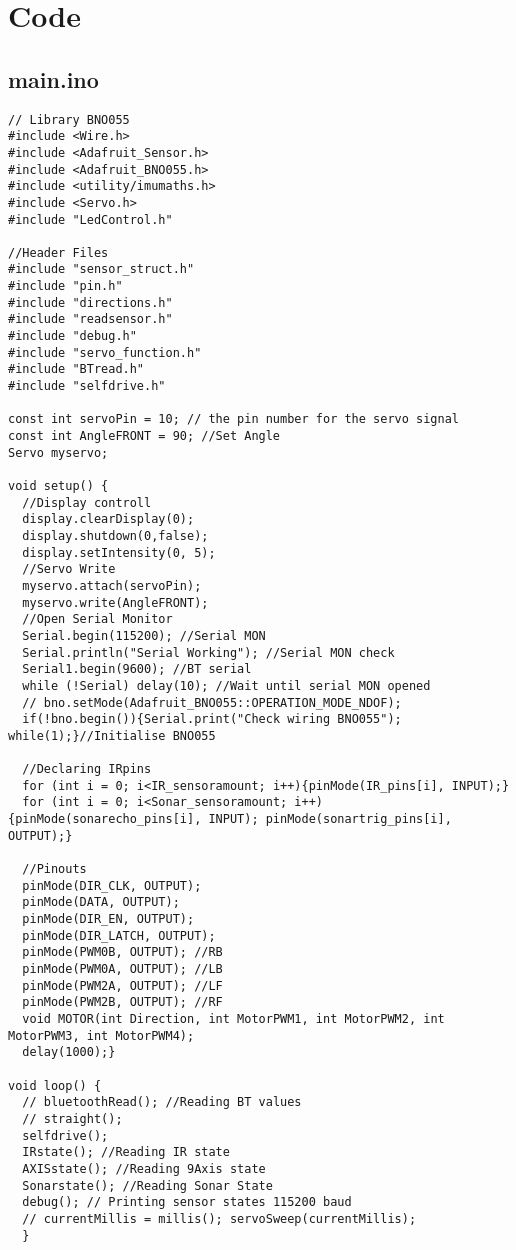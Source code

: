 \section{Code}
\subsection{main.ino}
\begin{lstlisting}
// Library BNO055
#include <Wire.h>
#include <Adafruit_Sensor.h>
#include <Adafruit_BNO055.h>
#include <utility/imumaths.h>
#include <Servo.h>
#include "LedControl.h"

//Header Files
#include "sensor_struct.h"	
#include "pin.h"
#include "directions.h"
#include "readsensor.h"
#include "debug.h"
#include "servo_function.h"
#include "BTread.h"
#include "selfdrive.h"

const int servoPin = 10; // the pin number for the servo signal
const int AngleFRONT = 90; //Set Angle
Servo myservo;

void setup() {
  //Display controll 
  display.clearDisplay(0);
  display.shutdown(0,false);
  display.setIntensity(0, 5); 
  //Servo Write
  myservo.attach(servoPin);
  myservo.write(AngleFRONT);
  //Open Serial Monitor
  Serial.begin(115200); //Serial MON
  Serial.println("Serial Working"); //Serial MON check
  Serial1.begin(9600); //BT serial
  while (!Serial) delay(10); //Wait until serial MON opened
  // bno.setMode(Adafruit_BNO055::OPERATION_MODE_NDOF);
  if(!bno.begin()){Serial.print("Check wiring BNO055"); while(1);}//Initialise BNO055
  
  //Declaring IRpins
  for (int i = 0; i<IR_sensoramount; i++){pinMode(IR_pins[i], INPUT);}
  for (int i = 0; i<Sonar_sensoramount; i++){pinMode(sonarecho_pins[i], INPUT); pinMode(sonartrig_pins[i], OUTPUT);}

  //Pinouts
  pinMode(DIR_CLK, OUTPUT);
  pinMode(DATA, OUTPUT);
  pinMode(DIR_EN, OUTPUT);
  pinMode(DIR_LATCH, OUTPUT);
  pinMode(PWM0B, OUTPUT); //RB
  pinMode(PWM0A, OUTPUT); //LB
  pinMode(PWM2A, OUTPUT); //LF
  pinMode(PWM2B, OUTPUT); //RF 
  void MOTOR(int Direction, int MotorPWM1, int MotorPWM2, int MotorPWM3, int MotorPWM4);
  delay(1000);}

void loop() {
  // bluetoothRead(); //Reading BT values
  // straight();
  selfdrive();
  IRstate(); //Reading IR state
  AXISstate(); //Reading 9Axis state
  Sonarstate(); //Reading Sonar State
  debug(); // Printing sensor states 115200 baud
  // currentMillis = millis(); servoSweep(currentMillis);
  }
\end{lstlisting}
